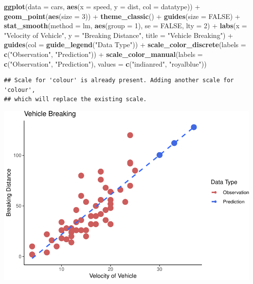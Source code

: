 \documentclass[]{article}
\newenvironment{Shaded}{}{}
\newcommand{\DataTypeTok}[1]{\textcolor[rgb]{0.56,0.13,0.00}{#1}}
\newcommand{\DecValTok}[1]{\textcolor[rgb]{0.25,0.63,0.44}{#1}}
\newcommand{\KeywordTok}[1]{\textcolor[rgb]{0.00,0.44,0.13}{\textbf{#1}}}
\newcommand{\NormalTok}[1]{#1}
\newcommand{\OperatorTok}[1]{\textcolor[rgb]{0.40,0.40,0.40}{#1}}
\newcommand{\OtherTok}[1]{\textcolor[rgb]{0.00,0.44,0.13}{#1}}
\newcommand{\StringTok}[1]{\textcolor[rgb]{0.25,0.44,0.63}{#1}}
\begin{document}
\begin{Shaded}
\begin{Highlighting}[]
\KeywordTok{ggplot}\NormalTok{(}\DataTypeTok{data =}\NormalTok{ cars, }\KeywordTok{aes}\NormalTok{(}\DataTypeTok{x =}\NormalTok{ speed, }\DataTypeTok{y =}\NormalTok{ dist, }\DataTypeTok{col =}\NormalTok{ datatype)) }\OperatorTok{+}
\StringTok{  }\KeywordTok{geom_point}\NormalTok{(}\KeywordTok{aes}\NormalTok{(}\DataTypeTok{size =} \DecValTok{3}\NormalTok{)) }\OperatorTok{+}
\StringTok{  }\KeywordTok{theme_classic}\NormalTok{() }\OperatorTok{+}
\StringTok{  }\KeywordTok{guides}\NormalTok{(}\DataTypeTok{size =} \OtherTok{FALSE}\NormalTok{) }\OperatorTok{+}
\StringTok{  }\KeywordTok{stat_smooth}\NormalTok{(}\DataTypeTok{method =}\NormalTok{ lm, }\KeywordTok{aes}\NormalTok{(}\DataTypeTok{group =} \DecValTok{1}\NormalTok{), }\DataTypeTok{se =} \OtherTok{FALSE}\NormalTok{, }\DataTypeTok{lty =} \DecValTok{2}\NormalTok{) }\OperatorTok{+}
\StringTok{  }\KeywordTok{labs}\NormalTok{(}\DataTypeTok{x =} \StringTok{"Velocity of Vehicle"}\NormalTok{, }\DataTypeTok{y =} \StringTok{"Breaking Distance"}\NormalTok{, }\DataTypeTok{title =} \StringTok{"Vehicle Breaking"}\NormalTok{) }\OperatorTok{+}
\StringTok{  }\KeywordTok{guides}\NormalTok{(}\DataTypeTok{col =} \KeywordTok{guide_legend}\NormalTok{(}\StringTok{"Data Type"}\NormalTok{)) }\OperatorTok{+}\StringTok{ }
\StringTok{  }\KeywordTok{scale_color_discrete}\NormalTok{(}\DataTypeTok{labels =} \KeywordTok{c}\NormalTok{(}\StringTok{"Observation"}\NormalTok{, }\StringTok{"Prediction"}\NormalTok{)) }\OperatorTok{+}
\StringTok{  }\KeywordTok{scale_color_manual}\NormalTok{(}\DataTypeTok{labels =} \KeywordTok{c}\NormalTok{(}\StringTok{"Observation"}\NormalTok{, }\StringTok{"Prediction"}\NormalTok{),}
                     \DataTypeTok{values =} \KeywordTok{c}\NormalTok{(}\StringTok{"indianred"}\NormalTok{, }\StringTok{"royalblue"}\NormalTok{))}
\end{Highlighting}
\end{Shaded}

\begin{verbatim}
## Scale for 'colour' is already present. Adding another scale for 'colour',
## which will replace the existing scale.
\end{verbatim}

\includegraphics{./figure/unnamed-chunk-17-1.pdf}
\end{document}
